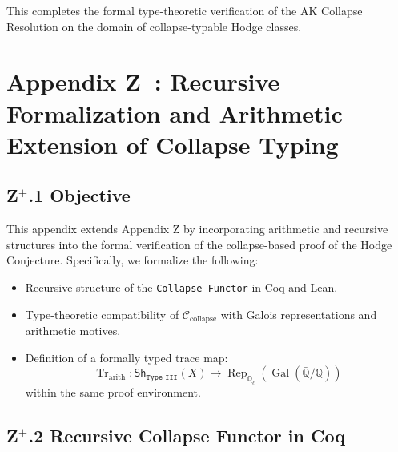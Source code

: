 \documentclass[11pt]{article}
\begin{document}
This completes the formal type-theoretic verification of the AK Collapse Resolution on the domain of collapse-typable Hodge classes.

\begin{center}
\end{center}



\section*{Appendix Z$^+$: Recursive Formalization and Arithmetic Extension of Collapse Typing}

\subsection*{Z$^+$.1 Objective}

This appendix extends Appendix Z by incorporating arithmetic and recursive structures into the formal verification of the collapse-based proof of the Hodge Conjecture. Specifically, we formalize the following:

\begin{itemize}
  \item Recursive structure of the \texttt{Collapse Functor} in Coq and Lean.
  \item Type-theoretic compatibility of $\mathcal{C}_{\text{collapse}}$ with Galois representations and arithmetic motives.
  \item Definition of a formally typed trace map:
  \[
  \operatorname{Tr}_{\mathrm{arith}} : \mathsf{Sh}_{\texttt{Type III}}(X) \to \operatorname{Rep}_{\mathbb{Q}_\ell}(\operatorname{Gal}(\bar{\mathbb{Q}}/\mathbb{Q}))
  \]
  within the same proof environment.
\end{itemize}

\subsection*{Z$^+$.2 Recursive Collapse Functor in Coq}
\end{document}
